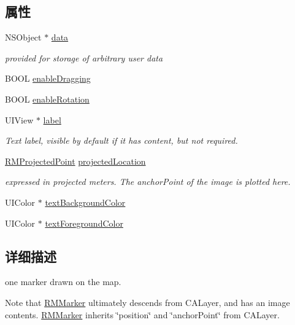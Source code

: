 \subsection*{属性}
\begin{DoxyCompactItemize}
\item 
N\-S\-Object $\ast$ \hyperlink{interface_r_m_marker_ae31cf29f5239ae3410a9aa18f7831949}{data}
\begin{DoxyCompactList}\small\item\em provided for storage of arbitrary user data \end{DoxyCompactList}\item 
B\-O\-O\-L \hyperlink{interface_r_m_marker_abdaaec7c6a67902e90e95c072ca19f0a}{enable\-Dragging}
\item 
B\-O\-O\-L \hyperlink{interface_r_m_marker_afba7d967f0f18ec0d5dc668a9a3e27ff}{enable\-Rotation}
\item 
U\-I\-View $\ast$ \hyperlink{interface_r_m_marker_a8eb1ce06dea5a1c89feb3b7b8c7de25c}{label}
\begin{DoxyCompactList}\small\item\em Text label, visible by default if it has content, but not required. \end{DoxyCompactList}\item 
\hyperlink{struct_r_m_projected_point}{R\-M\-Projected\-Point} \hyperlink{interface_r_m_marker_ac810ea4f4af07c3b3fc5300fe40eebd5}{projected\-Location}
\begin{DoxyCompactList}\small\item\em expressed in projected meters. The anchor\-Point of the image is plotted here. \end{DoxyCompactList}\item 
U\-I\-Color $\ast$ \hyperlink{interface_r_m_marker_a75d470aa3039d2fc8212550c7e18a401}{text\-Background\-Color}
\item 
U\-I\-Color $\ast$ \hyperlink{interface_r_m_marker_a8c17bd3321a486c5738c5b7521e07022}{text\-Foreground\-Color}
\end{DoxyCompactItemize}


\subsection{详细描述}
one marker drawn on the map. 

Note that \hyperlink{interface_r_m_marker}{R\-M\-Marker} ultimately descends from C\-A\-Layer, and has an image contents. \hyperlink{interface_r_m_marker}{R\-M\-Marker} inherits \char`\"{}position\char`\"{} and \char`\"{}anchor\-Point\char`\"{} from C\-A\-Layer. 

